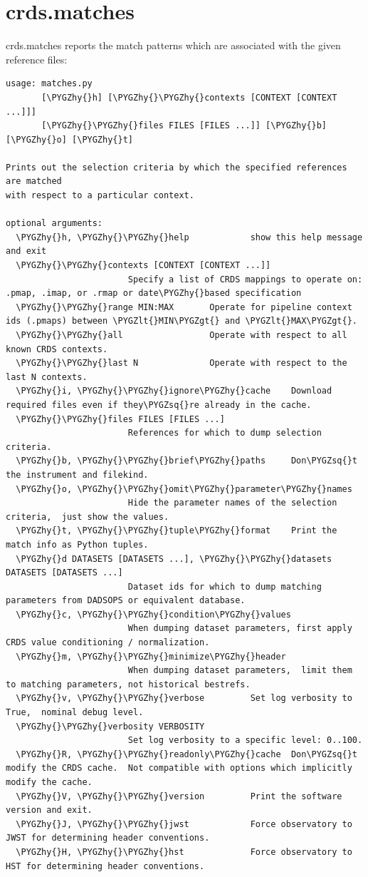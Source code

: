 \documentclass[letterpaper,10pt,english]{sphinxmanual}
\def\PYGZlt{\char`\<}
\def\PYGZgt{\char`\>}
\def\PYGZhy{\char`\-}
\def\PYGZsq{\char`\'}
\renewcommand\PYGZsq{\textquotesingle}
\begin{document}
\section{crds.matches}
\label{command_line_tools:crds-matches}
crds.matches reports the match patterns which are associated with the given
reference files:

\begin{Verbatim}[commandchars=\\\{\}]
usage: matches.py
       [\PYGZhy{}h] [\PYGZhy{}\PYGZhy{}contexts [CONTEXT [CONTEXT ...]]]
       [\PYGZhy{}\PYGZhy{}files FILES [FILES ...]] [\PYGZhy{}b] [\PYGZhy{}o] [\PYGZhy{}t]

Prints out the selection criteria by which the specified references are matched
with respect to a particular context.

optional arguments:
  \PYGZhy{}h, \PYGZhy{}\PYGZhy{}help            show this help message and exit
  \PYGZhy{}\PYGZhy{}contexts [CONTEXT [CONTEXT ...]]
                        Specify a list of CRDS mappings to operate on: .pmap, .imap, or .rmap or date\PYGZhy{}based specification
  \PYGZhy{}\PYGZhy{}range MIN:MAX       Operate for pipeline context ids (.pmaps) between \PYGZlt{}MIN\PYGZgt{} and \PYGZlt{}MAX\PYGZgt{}.
  \PYGZhy{}\PYGZhy{}all                 Operate with respect to all known CRDS contexts.
  \PYGZhy{}\PYGZhy{}last N              Operate with respect to the last N contexts.
  \PYGZhy{}i, \PYGZhy{}\PYGZhy{}ignore\PYGZhy{}cache    Download required files even if they\PYGZsq{}re already in the cache.
  \PYGZhy{}\PYGZhy{}files FILES [FILES ...]
                        References for which to dump selection criteria.
  \PYGZhy{}b, \PYGZhy{}\PYGZhy{}brief\PYGZhy{}paths     Don\PYGZsq{}t the instrument and filekind.
  \PYGZhy{}o, \PYGZhy{}\PYGZhy{}omit\PYGZhy{}parameter\PYGZhy{}names
                        Hide the parameter names of the selection criteria,  just show the values.
  \PYGZhy{}t, \PYGZhy{}\PYGZhy{}tuple\PYGZhy{}format    Print the match info as Python tuples.
  \PYGZhy{}d DATASETS [DATASETS ...], \PYGZhy{}\PYGZhy{}datasets DATASETS [DATASETS ...]
                        Dataset ids for which to dump matching parameters from DADSOPS or equivalent database.
  \PYGZhy{}c, \PYGZhy{}\PYGZhy{}condition\PYGZhy{}values
                        When dumping dataset parameters, first apply CRDS value conditioning / normalization.
  \PYGZhy{}m, \PYGZhy{}\PYGZhy{}minimize\PYGZhy{}header
                        When dumping dataset parameters,  limit them to matching parameters, not historical bestrefs.
  \PYGZhy{}v, \PYGZhy{}\PYGZhy{}verbose         Set log verbosity to True,  nominal debug level.
  \PYGZhy{}\PYGZhy{}verbosity VERBOSITY
                        Set log verbosity to a specific level: 0..100.
  \PYGZhy{}R, \PYGZhy{}\PYGZhy{}readonly\PYGZhy{}cache  Don\PYGZsq{}t modify the CRDS cache.  Not compatible with options which implicitly modify the cache.
  \PYGZhy{}V, \PYGZhy{}\PYGZhy{}version         Print the software version and exit.
  \PYGZhy{}J, \PYGZhy{}\PYGZhy{}jwst            Force observatory to JWST for determining header conventions.
  \PYGZhy{}H, \PYGZhy{}\PYGZhy{}hst             Force observatory to HST for determining header conventions.
\end{Verbatim}
\end{document}
